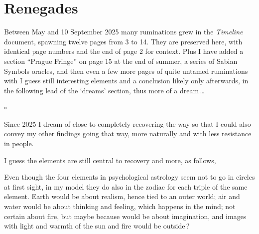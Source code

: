 



\avantgarde

\section{Renegades}

Between May and 10 September 2025
many ruminations grew in the $\!$\textsl{Timeline} document,
spawning twelve pages from 3 to 14.
%
They are preserved here,
with identical page numbers
and the end of page 2 for context.
%
Plus
I have added a section “Prague Fringe”
on page 15
at the end of summer,
a series of Sabian Symbols oracles,
and then even a few more pages
of quite untamed ruminations
with I guess still interesting elements
and a conclusion likely only afterwards,
in the following lead of the ‘dreams’ section,
thus more of a dream$\,$…

\color{odyssey}

\vspace{3mm}
\hspace{5mm}\begin{minipage}[t]{85.5mm}

\footnotesize
\begin{list}{$\circ$}{\setlength{\leftmargin}{10pt}}

\item
Since 2025 I dream of close to completely recovering the way
so that I could also convey my other findings going that way,
more naturally and with less resistance in people.

\end{list}

\end{minipage}

\color{black}

\normalsize

\vspace{4mm}
\noindent
I guess the elements are still central to recovery and more, as follows,

Even though the four elements in psychological astrology
seem not to go in circles at first sight,
in my model they do also in the zodiac
for each triple of the same element.
%
Earth would be about realism, hence tied to an outer world;
air and water would be about thinking and feeling, which happens in the mind;
not certain about fire, but maybe because would be about imagination,
and images with light and warmth of the sun and fire would be outside\,?

